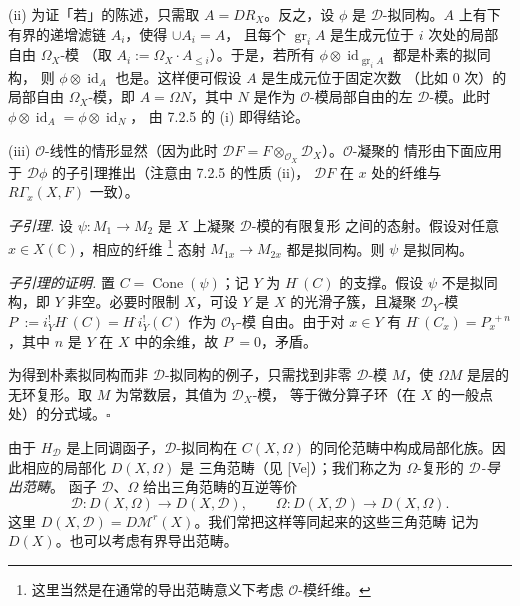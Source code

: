 (ii) 为证「若」的陈述，只需取 $A=DR_X$。反之，设 $\phi$ 是
$\mathcal{D}$-拟同构。$A$ 上有下有界的递增滤链 $A_i$，使得 $\cup A_i=A$，
且每个 $\operatorname{gr}_iA$ 是生成元位于 $i$ 次处的局部自由 $\Omega_X$-模
（取 $A_i:=\Omega_X\cdot A_{\le i}$）。于是，若所有
$\phi\otimes\operatorname{id}_{\operatorname{gr}_iA}$ 都是朴素的拟同构，
则 $\phi\otimes\operatorname{id}_A$ 也是。这样便可假设 $A$ 是生成元位于固定次数
（比如 0 次）的局部自由 $\Omega_X$-模，即 $A=\Omega N$，其中 $N$ 是作为
$\mathcal{O}$-模局部自由的左 $\mathcal{D}$-模。此时
$\phi\otimes\operatorname{id}_A=\phi\otimes\operatorname{id}_N$，
由 7.2.5 的 (i) 即得结论。

(iii) $\mathcal{O}$-线性的情形显然（因为此时
$\mathcal{D}F=F\otimes_{\mathcal{O}_X}\mathcal{D}_X$）。$\mathcal{O}$-凝聚的
情形由下面应用于 $\mathcal{D}\phi$ 的子引理推出（注意由 7.2.5 的性质 (ii)，
$\mathcal{D}F$ 在 $x$ 处的纤维与 $R\Gamma_x(X,F)$ 一致）。

\emph{子引理.} 设 $\psi:M_1\to M_2$ 是 $X$ 上凝聚 $\mathcal{D}$-模的有限复形
之间的态射。假设对任意 $x\in X(\mathbb{C})$，相应的纤维%
\footnote{这里当然是在通常的导出范畴意义下考虑 $\mathcal{O}$-模纤维。
}%
态射 $M_{1x}\to M_{2x}$ 都是拟同构。则 $\psi$ 是拟同构。


\emph{子引理的证明.} 置 $C=\operatorname{Cone}(\psi)$；记 $Y$ 为 $H^{\cdot}(C)$
的支撑。假设 $\psi$ 不是拟同构，即 $Y$ 非空。必要时限制 $X$，可设 $Y$ 是 $X$
的光滑子簇，且凝聚 $\mathcal{D}_Y$-模
$P^{\cdot}:=i_Y^{!}H^{\cdot}(C)=H^{\cdot}i_Y^{!}(C)$ 作为 $\mathcal{O}_Y$-模
自由。由于对 $x\in Y$ 有 $H^{\cdot}(C_x)=P_x^{\cdot+n}$，其中 $n$ 是 $Y$ 在
$X$ 中的余维，故 $P^{\cdot}=0$，矛盾。

为得到朴素拟同构而非 $\mathcal{D}$-拟同构的例子，只需找到非零 $\mathcal{D}$-模
$M$，使 $\Omega M$ 是层的无环复形。取 $M$ 为常数层，其值为 $\mathcal{D}_X$-模，
等于微分算子环（在 $X$ 的一般点处）的分式域。\hfill$\square$

 由于 $H_{\mathcal{D}}$ 是上同调函子，$\mathcal{D}$-拟同构在
$C(X,\Omega)$ 的同伦范畴中构成局部化族。因此相应的局部化 $D(X,\Omega)$ 是
三角范畴（见 [Ve]）；我们称之为 $\Omega$-复形的 \emph{$\mathcal{D}$-导出范畴}。
函子 $\mathcal{D}$、$\Omega$ 给出三角范畴的互逆等价
\begin{equation}\tag{308}
\mathcal{D}:D(X,\Omega)\longrightarrow D(X,\mathcal{D}),
\qquad
\Omega:D(X,\mathcal{D})\longrightarrow D(X,\Omega).
\end{equation}
这里 $D(X,\mathcal{D})=D\mathcal{M}^{r}(X)$。我们常把这样等同起来的这些三角范畴
记为 $D(X)$。也可以考虑有界导出范畴。

